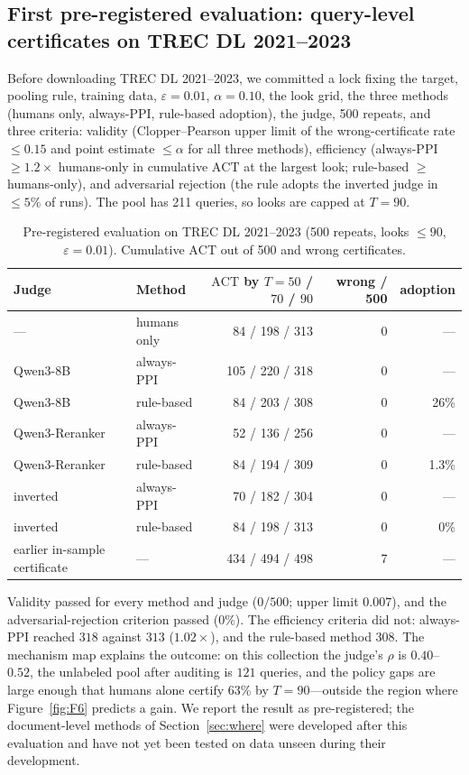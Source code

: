 \documentclass{article}
\newcommand{\eps}{\varepsilon}
\newcommand{\ACT}{\mathrm{ACT}}
\begin{document}
\subsection{First pre-registered evaluation: query-level certificates on TREC DL 2021--2023}
Before downloading TREC DL 2021--2023, we committed a lock fixing the target, pooling rule, training data, $\eps=0.01$, $\alpha=0.10$, the look grid, the three methods (humans only, always-PPI, rule-based adoption), the judge, 500 repeats, and three criteria: validity (Clopper--Pearson upper limit of the wrong-certificate rate $\le0.15$ and point estimate $\le\alpha$ for all three methods), efficiency (always-PPI $\ge1.2\times$ humans-only in cumulative $\ACT$ at the largest look; rule-based $\ge$ humans-only), and adversarial rejection (the rule adopts the inverted judge in $\le5\%$ of runs). The pool has 211 queries, so looks are capped at $T=90$.

\begin{table}[t]\centering\small
\caption{Pre-registered evaluation on TREC DL 2021--2023 (500 repeats, looks $\le90$, $\eps=0.01$). Cumulative $\ACT$ out of 500 and wrong certificates.}\label{tab:prereg}
\begin{tabular}{llrrr}\toprule
Judge & Method & $\ACT$ by $T{=}50$ / $70$ / $90$ & wrong / 500 & adoption\\\midrule
--- & humans only & 84 / 198 / 313 & 0 & ---\\
Qwen3-8B & always-PPI & 105 / 220 / 318 & 0 & ---\\
Qwen3-8B & rule-based & 84 / 203 / 308 & 0 & 26\%\\
Qwen3-Reranker & always-PPI & 52 / 136 / 256 & 0 & ---\\
Qwen3-Reranker & rule-based & 84 / 194 / 309 & 0 & 1.3\%\\
inverted & always-PPI & 70 / 182 / 304 & 0 & ---\\
inverted & rule-based & 84 / 198 / 313 & 0 & 0\%\\
earlier in-sample certificate & --- & 434 / 494 / 498 & 7 & ---\\\bottomrule
\end{tabular}
\end{table}

Validity passed for every method and judge ($0/500$; upper limit $0.007$), and the adversarial-rejection criterion passed ($0\%$). The efficiency criteria did not: always-PPI reached $318$ against $313$ ($1.02\times$), and the rule-based method $308$. The mechanism map explains the outcome: on this collection the judge's $\rho$ is $0.40$--$0.52$, the unlabeled pool after auditing is $121$ queries, and the policy gaps are large enough that humans alone certify 63\% by $T=90$---outside the region where Figure~\ref{fig:F6} predicts a gain. We report the result as pre-registered; the document-level methods of Section~\ref{sec:where} were developed after this evaluation and have not yet been tested on data unseen during their development.
\end{document}
